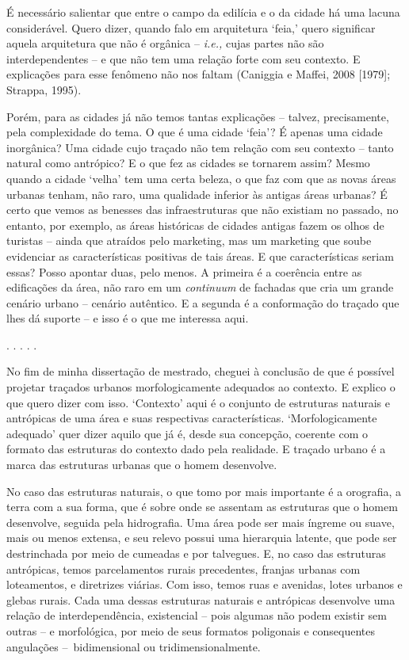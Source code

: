 \documentclass[12pt, a4paper]{book} %
\begin{document}
        É necessário salientar que entre o campo da edilícia e o da cidade há uma lacuna considerável. Quero dizer, quando falo em arquitetura `feia,' quero significar aquela arquitetura que não é orgânica – \textit{i.e.,} cujas partes não são interdependentes – e que não tem uma relação forte com seu contexto. E explicações para esse fenômeno não nos faltam (Caniggia e Maffei, 2008 [1979]; Strappa, 1995).

        Porém, para as cidades já não temos tantas explicações – talvez, precisamente, pela complexidade do tema. O que é uma cidade `feia'? É apenas uma cidade inorgânica? Uma cidade cujo traçado não tem relação com seu contexto – tanto natural como antrópico? E o que fez as cidades se tornarem assim? Mesmo quando a cidade `velha' tem uma certa beleza, o que faz com que as novas áreas urbanas tenham, não raro, uma qualidade inferior às antigas áreas urbanas? É certo que vemos as benesses das infraestruturas que não existiam no passado, no entanto, por exemplo, as áreas históricas de cidades antigas fazem os olhos de turistas – ainda que atraídos pelo marketing, mas um marketing que soube evidenciar as características positivas de tais áreas. E que características seriam essas? Posso apontar duas, pelo menos. A primeira é a coerência entre as edificações da área, não raro em um \textit{continuum} de fachadas que cria um grande cenário urbano – cenário autêntico. E a segunda é a conformação do traçado que lhes dá suporte – e isso é o que me interessa aqui.

        \begin{center}
        . . . . .
        \end{center}

        No fim de minha dissertação de mestrado, cheguei à conclusão de que é possível projetar traçados urbanos morfologicamente adequados ao contexto. E explico o que quero dizer com isso. `Contexto' aqui é o conjunto de estruturas naturais e antrópicas de uma área e suas respectivas características. `Morfologicamente adequado' quer dizer aquilo que já é, desde sua concepção, coerente com o formato das estruturas do contexto dado pela realidade. E traçado urbano é a marca das estruturas urbanas que o homem desenvolve.

        No caso das estruturas naturais, o que tomo por mais importante é a orografia, a terra com a sua forma, que é sobre onde se assentam as estruturas que o homem desenvolve, seguida pela hidrografia. Uma área pode ser mais íngreme ou suave, mais ou menos extensa, e seu relevo possui uma hierarquia latente, que pode ser destrinchada por meio de cumeadas e por talvegues. E, no caso das estruturas antrópicas, temos parcelamentos rurais precedentes, franjas urbanas com loteamentos, e diretrizes viárias. Com isso, temos ruas e avenidas, lotes urbanos e glebas rurais. Cada uma dessas estruturas naturais e antrópicas desenvolve uma relação de interdependência, existencial – pois algumas não podem existir sem outras – e morfológica, por meio de seus formatos poligonais e consequentes angulações – bidimensional ou tridimensionalmente. 
\end{document}
